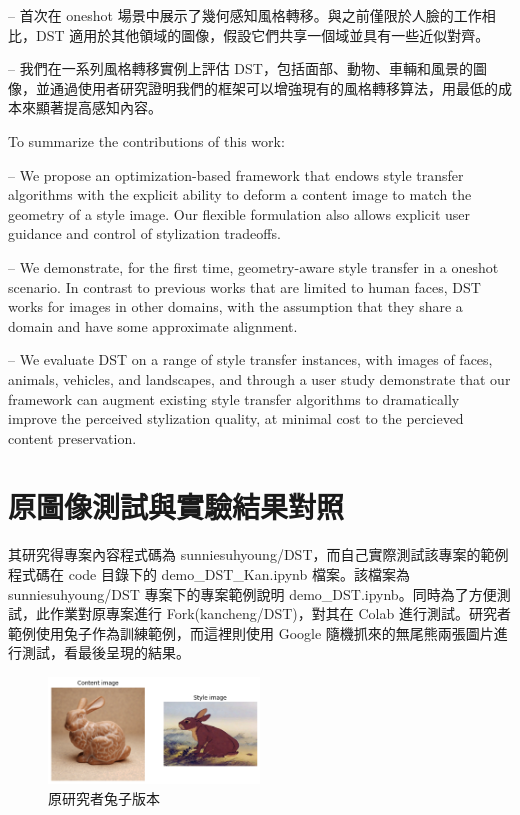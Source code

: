 \documentclass[10pt,UTF8]{ctexart}
\begin{document}
– 首次在 oneshot 場景中展示了幾何感知風格轉移。與之前僅限於人臉的工作相比，DST 適用於其他領域的圖像，假設它們共享一個域並具有一些近似對齊。

– 我們在一系列風格轉移實例上評估 DST，包括面部、動物、車輛和風景的圖像，並通過使用者研究證明我們的框架可以增強現有的風格轉移算法，用最低的成本來顯著提高感知內容。

To summarize the contributions of this work:

– We propose an optimization-based framework that endows style transfer algorithms with the explicit ability to deform a content image to match the geometry of a style image. Our flexible formulation also allows explicit user guidance and control of stylization tradeoffs.

– We demonstrate, for the first time, geometry-aware style transfer in a oneshot scenario.
In contrast to previous works that are limited to human faces, DST works for images in other domains, with the assumption that they share a domain and have some approximate alignment.

– We evaluate DST on a range of style transfer instances, with images of faces, animals, vehicles, and landscapes, and through a user study demonstrate that our framework can augment existing style transfer algorithms to dramatically improve the perceived stylization quality, at minimal cost to the percieved content preservation.

\newpage

\section{原圖像測試與實驗結果對照}

其研究得專案內容程式碼為 sunniesuhyoung/DST，而自己實際測試該專案的範例程式碼在 code 目錄下的 demo\_DST\_Kan.ipynb 檔案。該檔案為 sunniesuhyoung/DST 專案下的專案範例說明 demo\_DST.ipynb。同時為了方便測試，此作業對原專案進行 Fork(kancheng/DST)，對其在 Colab 進行測試。研究者範例使用兔子作為訓練範例，而這裡則使用 Google 隨機抓來的無尾熊兩張圖片進行測試，看最後呈現的結果。 

\begin{figure}[H]
\centering 
\includegraphics[width=0.50\textwidth]{r1.png} 
\caption{原研究者兔子版本}
\label{Test}
\end{figure}
\end{document}
